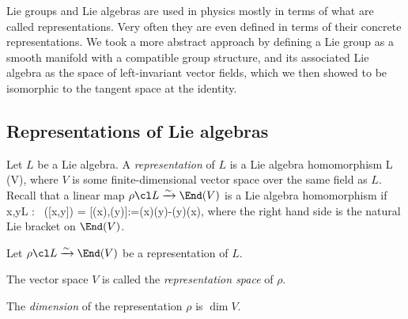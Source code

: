 
Lie groups and Lie algebras are used in physics mostly in terms of what are called representations. Very often they are even defined in terms of their concrete representations. We took a more abstract approach by defining a Lie group as a smooth manifold with a compatible group structure, and its associated Lie algebra as the space of left-invariant vector fields, which we then showed to be isomorphic to the tangent space at the identity.

\subsection{Representations of Lie algebras}

\bd
Let $L$ be a Lie algebra. A \emph{representation} of $L$ is a Lie algebra homomorphism
\bse
\rho\cl L \xrightarrow{\sim} \End(V),
\ese
where $V$ is some finite-dimensional vector space over the same field as $L$.
\ed
Recall that a linear map $\rho\cl L \xrightarrow{\sim} \End(V)$ is a Lie algebra homomorphism if
\bse
\forall \, x,y\in L : \ \rho([x,y]) = [\rho(x),\rho(y)]:=\rho(x)\circ\rho(y)-\rho(y)\circ\rho(x),
\ese
where the right hand side is the natural Lie bracket on $\End(V)$.

\bd
Let $\rho\cl L \xrightarrow{\sim}\End(V)$ be a representation of $L$.
\ben[label=\roman*)]
\item The vector space $V$ is called the \emph{representation space} of $\rho$.
\item The \emph{dimension} of the representation $\rho$ is $\dim V$.
\een
\ed

